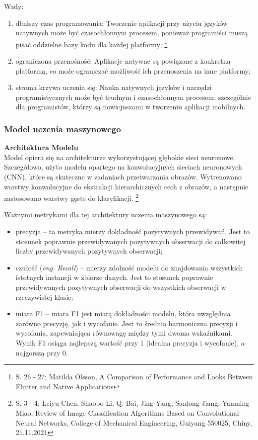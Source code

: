 \documentclass[12pt, a4paper, twoside, openany]{book}
\newcommand{\forceindent}{\leavevmode{\parindent=1.3em\indent}}
\begin{document}
Wady:
\begin{enumerate}[label=--]
    \item dłuższy czas programowania: Tworzenie aplikacji przy użyciu języków natywnych może być czasochłonnym procesem, ponieważ programiści muszą pisać oddzielne bazy kodu dla każdej platformy; \footnote{S. 26 - 27; Matilda Olsson, A Comparison of Performance and Looks Between Flutter and Native Applications}
    \item ograniczona przenośność: Aplikacje natywne są powiązane z konkretną platformą, co może ograniczać możliwość ich przenoszenia na inne platformy;
    \item stroma krzywa uczenia się: Nauka natywnych języków i narzędzi programistycznych może być trudnym i czasochłonnym procesem, szczególnie dla programistów, którzy są nowicjuszami w tworzeniu aplikacji mobilnych.
\end{enumerate}

\subsubsection{Model uczenia maszynowego}

\forceindent \textbf{Architektura Modelu\\}
\indent Model opiera się na architekturze wykorzystującej głębokie sieci neuronowe.
Szczegółowo, użyto modelu opartego na konwolucyjnych sieciach neuronowych (CNN), które są skuteczne w zadaniach przetwarzania obrazów.
Wytrenowano warstwy konwolucyjne do ekstrakcji hierarchicznych cech z obrazów, a następnie zastosowano warstwy gęste do klasyfikacji. \footnote{
    S. 3 - 4; Leiyu Chen, Shaobo Li, Q. Bai, Jing Yang, Sanlong Jiang, Yanming Miao, Review of Image Classification Algorithms Based on Convolutional Neural Networks, College of Mechanical Engineering, Guiyang 550025, Chiny, 21.11.2021
}

Ważnymi metrykami dla tej architektury uczenia maszynowego są:
\begin{itemize}[label=--]
    \item precyzja -- ta metryka mierzy dokładność pozytywnych przewidywań. Jest to stosunek poprawnie przewidywanych pozytywnych obserwacji do całkowitej liczby przewidywanych pozytywnych obserwacji;
    \item czułość (\textit{eng. Recall}) -- mierzy zdolność modelu do znajdowania wszystkich istotnych instancji w zbiorze danych. Jest to stosunek poprawnie przewidywanych pozytywnych obserwacji do wszystkich obserwacji w rzeczywistej klasie;
    \item miara F1 -- miara F1 jest miarą dokładności modelu, która uwzględnia zarówno precyzję, jak i wycofanie. Jest to średnia harmoniczna precyzji i wycofania, zapewniająca równowagę między tymi dwoma wskaźnikami. Wynik F1 osiąga najlepszą wartość przy 1 (idealna precyzja i wycofanie), a najgorszą przy 0.
\end{itemize}
\end{document}
